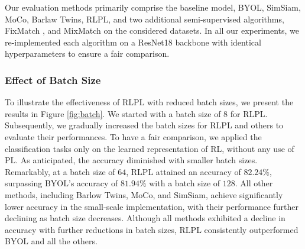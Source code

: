 \begin{table}[!htbp]
\centering
{}
\label{table:ablation}
\end{table}


Our evaluation methods primarily comprise the baseline model, BYOL, SimSiam, MoCo, Barlaw Twins, RLPL, and two additional semi-supervised algorithms, FixMatch \cite{sohn2020fixmatch}, and MixMatch \cite{berthelot2019mixmatch} on the considered datasets. In all our experiments, we re-implemented each algorithm on a ResNet18 backbone with identical hyperparameters to ensure a fair comparison.

\subsubsection{Effect of Batch Size}

To illustrate the effectiveness of RLPL with reduced batch sizes, we present the results in Figure \ref{fig:batch}. We started with a batch size of $8$ for RLPL. Subsequently, we gradually increased the batch sizes for RLPL and others to evaluate their performances. To have a fair comparison, we applied the classification tasks only on the learned representation of RL, without any use of PL. As anticipated, the accuracy diminished with smaller batch sizes. Remarkably, at a batch size of $64$, RLPL attained an accuracy of $82.24\%$, surpassing BYOL's accuracy of $81.94\%$ with a batch size of $128$. All other methods, including Barlow Twins, MoCo, and SimSiam, achieve significantly lower accuracy in the small-scale implementation, with their performance further declining as batch size decreases. Although all methods exhibited a decline in accuracy with further reductions in batch sizes, RLPL consistently outperformed BYOL and all the others.

